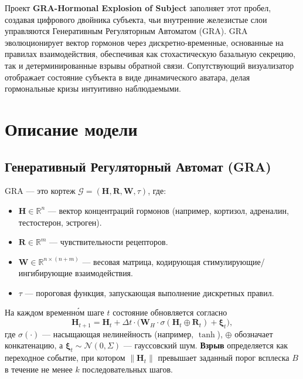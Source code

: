 \documentclass[conference]{IEEEtran}
\begin{document}
Проект \textbf{GRA-Hormonal Explosion of Subject} заполняет этот пробел, создавая цифрового двойника субъекта, чьи внутренние железистые слои управляются Генеративным Регуляторным Автоматом (GRA). GRA эволюционирует вектор гормонов через дискретно-временные, основанные на правилах взаимодействия, обеспечивая как стохастическую базальную секрецию, так и детерминированные взрывы обратной связи. Сопутствующий визуализатор отображает состояние субъекта в виде динамического аватара, делая гормональные кризы интуитивно наблюдаемыми.

\section{Описание модели}
\subsection{Генеративный Регуляторный Автомат (GRA)}
GRA — это кортеж $\mathcal{G} = (\mathbf{H}, \mathbf{R}, \mathbf{W}, \tau)$, где:
\begin{itemize}
    \item $\mathbf{H} \in \mathbb{R}^n$ — вектор концентраций гормонов (например, кортизол, адреналин, тестостерон, эстроген).
    \item $\mathbf{R} \in \mathbb{R}^{m}$ — чувствительности рецепторов.
    \item $\mathbf{W} \in \mathbb{R}^{n \times (n+m)}$ — весовая матрица, кодирующая стимулирующие/ингибирующие взаимодействия.
    \item $\tau$ — пороговая функция, запускающая выполнение дискретных правил.
\end{itemize}
На каждом временно́м шаге $t$ состояние обновляется согласно
\begin{equation}
    \mathbf{H}_{t+1} = \mathbf{H}_t + \Delta t \cdot \big( \mathbf{W}_{H} \cdot \sigma(\mathbf{H}_t \oplus \mathbf{R}_t) + \boldsymbol{\xi}_t \big),
    \label{eq:update}
\end{equation}
где $\sigma(\cdot)$ — насыщающая нелинейность (например, $\tanh$), $\oplus$ обозначает конкатенацию, а $\boldsymbol{\xi}_t \sim \mathcal{N}(0,\Sigma)$ — гауссовский шум. \textbf{Взрыв} определяется как переходное событие, при котором $\|\mathbf{H}_t\|$ превышает заданный порог всплеска $B$ в течение не менее $k$ последовательных шагов.
\end{document}
